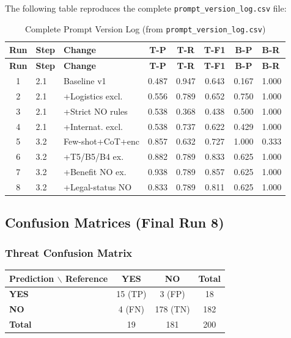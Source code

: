 The following table reproduces the complete \texttt{prompt\_version\_log.csv} file:

\begin{longtable}{@{}clp{4cm}ccccl@{}}
\caption{Complete Prompt Version Log (from \texttt{prompt\_version\_log.csv})} \\
\toprule
\textbf{Run} & \textbf{Step} & \textbf{Change} & \textbf{T-P} & \textbf{T-R} & \textbf{T-F1} & \textbf{B-P} & \textbf{B-R} \\
\midrule
\endfirsthead
\toprule
\textbf{Run} & \textbf{Step} & \textbf{Change} & \textbf{T-P} & \textbf{T-R} & \textbf{T-F1} & \textbf{B-P} & \textbf{B-R} \\
\midrule
\endhead
1 & 2.1 & Baseline v1 & 0.487 & 0.947 & 0.643 & 0.167 & 1.000 \\
2 & 2.1 & +Logistics excl. & 0.556 & 0.789 & 0.652 & 0.750 & 1.000 \\
3 & 2.1 & +Strict NO rules & 0.538 & 0.368 & 0.438 & 0.500 & 1.000 \\
4 & 2.1 & +Internat. excl. & 0.538 & 0.737 & 0.622 & 0.429 & 1.000 \\
5 & 3.2 & Few-shot+CoT+enc & 0.857 & 0.632 & 0.727 & 1.000 & 0.333 \\
6 & 3.2 & +T5/B5/B4 ex. & 0.882 & 0.789 & 0.833 & 0.625 & 1.000 \\
7 & 3.2 & +Benefit NO ex. & 0.938 & 0.789 & 0.857 & 0.625 & 1.000 \\
\rowcolor{pass!15}
8 & 3.2 & +Legal-status NO & 0.833 & 0.789 & 0.811 & 0.625 & 1.000 \\
\bottomrule
\end{longtable}

\subsection{Confusion Matrices (Final Run 8)}
\label{app:confusion}

\subsubsection*{Threat Confusion Matrix}

\begin{table}[H]
\centering
\begin{tabular}{@{}l|cc|c@{}}
\toprule
\textbf{Prediction $\backslash$ Reference} & \textbf{YES} & \textbf{NO} & \textbf{Total} \\
\midrule
\textbf{YES} & 15 (TP)  & 3 (FP)   & 18 \\
\textbf{NO}  & 4 (FN)   & 178 (TN) & 182 \\
\midrule
\textbf{Total} & 19 & 181 & 200 \\
\bottomrule
\end{tabular}
\end{table}

